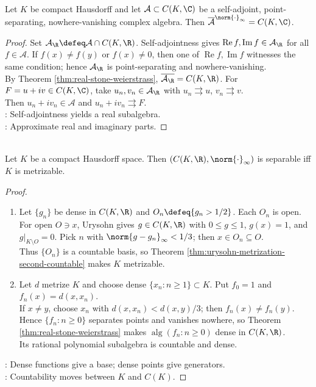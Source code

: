 \begin{theorem} \label{thm:complex-stone-weierstrass} \\
Let $K$ be compact Hausdorff and let $\mathcal{A}\subset C(K,\C)$ be a self-adjoint, point-separating, nowhere-vanishing complex algebra. Then $\overline{\mathcal{A}}^{\norm{\cdot}_\infty}=C(K,\C)$.
\begin{proof}
Set $\mathcal{A}_{\R}\defeq\mathcal{A}\cap C(K,\R)$. Self-adjointness gives $\operatorname{Re}f,\operatorname{Im}f\in\mathcal{A}_{\R}$ for all $f\in\mathcal{A}$. If $f(x)\neq f(y)$ or $f(x)\neq0$, then one of $\operatorname{Re}f,\operatorname{Im}f$ witnesses the same condition; hence $\mathcal{A}_{\R}$ is point-separating and nowhere-vanishing.\\
By Theorem \ref{thm:real-stone-weierstrass}, $\overline{\mathcal{A}_{\R}}=C(K,\R)$. For $F=u+iv\in C(K,\C)$, take $u_n,v_n\in\mathcal{A}_{\R}$ with $u_n\rightrightarrows u$, $v_n\rightrightarrows v$.\\
Then $u_n+iv_n\in\mathcal{A}$ and $u_n+iv_n\rightrightarrows F$.\\
: Self-adjointness yields a real subalgebra.\\
: Approximate real and imaginary parts.
\end{proof}
\end{theorem}

\begin{theorem} \label{thm:riesz-cx-separable-iff-metrizable} \\
Let $K$ be a compact Hausdorff space. Then $(C(K,\R),\norm{\cdot}_\infty)$ is separable iff $K$ is metrizable.
\begin{proof}
\begin{enumerate}[label=\roman*.]
\setlength{\itemsep}{0pt}
\item[$(\Rightarrow)$] Let $\{g_n\}$ be dense in $C(K,\R)$ and $O_n\defeq\{g_n>1/2\}$. Each $O_n$ is open. For open $O\ni x$, Urysohn gives $g\in C(K,\R)$ with $0\leq g\leq1$, $g(x)=1$, and $g|_{K\setminus O}=0$. Pick $n$ with $\norm{g-g_n}_\infty<1/3$; then $x\in O_n\subseteq O$.\\
Thus $\{O_n\}$ is a countable basis, so Theorem \ref{thm:urysohn-metrization-second-countable} makes $K$ metrizable.
\item[$(\Leftarrow)$] Let $d$ metrize $K$ and choose dense $\{x_n:n\geq1\}\subset K$. Put $f_0=1$ and $f_n(x)=d(x,x_n)$.\\
If $x\neq y$, choose $x_n$ with $d(x,x_n)<d(x,y)/3$; then $f_n(x)\neq f_n(y)$. Hence $\{f_n:n\geq0\}$ separates points and vanishes nowhere, so Theorem \ref{thm:real-stone-weierstrass} makes $\operatorname{alg}(f_n:n\geq0)$ dense in $C(K,\R)$.\\
Its rational polynomial subalgebra is countable and dense.
\end{enumerate}
: Dense functions give a base; dense points give generators.\\
: Countability moves between $K$ and $C(K)$.
\end{proof}
\end{theorem}


